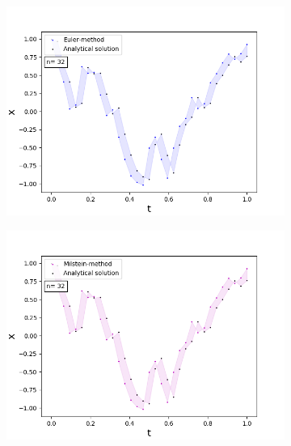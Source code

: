 \begin{figure}[!h]
\centering
   \begin{subfigure}{0.49\linewidth} \centering
     \includegraphics[scale=0.4]{Content/Graphics/Appendix/1ou}
   \end{subfigure}
   \begin{subfigure}{0.49\linewidth} \centering
     \includegraphics[scale=0.4]{Content/Graphics/Appendix/2ou}
   \end{subfigure}
   \begin{subfigure}{0.49\linewidth} \centering

\end{subfigure}
\end{figure}
